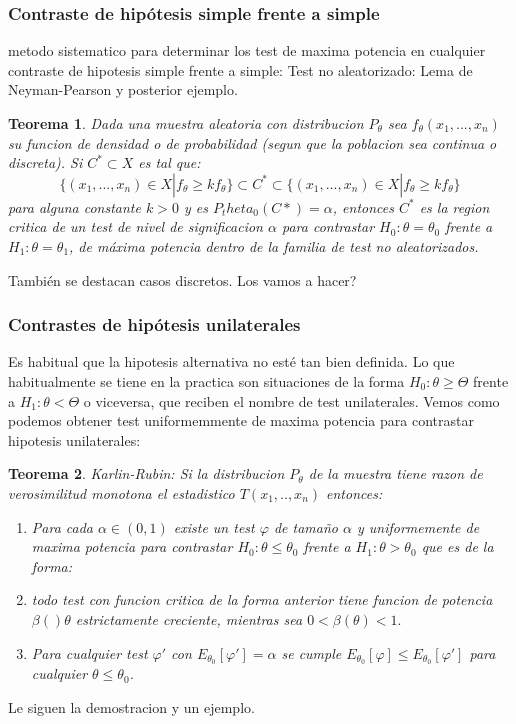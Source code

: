 \documentclass[a4paper,12pt]{article}
\newtheorem{theorem}{Teorema}
\begin{document}
\subsubsection{Contraste de hipótesis simple frente a simple}
metodo sistematico para determinar los test de maxima potencia en cualquier contraste de hipotesis simple frente a simple:
Test no aleatorizado:
Lema de Neyman-Pearson y posterior ejemplo.
\begin{theorem}
Dada una muestra aleatoria con distribucion $P_\theta$ sea $f_\theta(x_1,...,x_n)$ su funcion de densidad o de probabilidad (segun que la poblacion sea continua o discreta). Si $C^*\subset X$ es tal que: $$\{(x_1,...,x_n)\in X | f_\theta \ge kf_\theta\}\subset C^*\subset\{(x_1,...,x_n)\in X | f_\theta \geq kf_\theta\}$$
para alguna constante $k>0$ y es $P_theta_0(C*)=\alpha$, entonces $C^*$ es la region critica de un test de nivel de significacion $\alpha$ para contrastar $H_0:\theta =\theta_0$ frente a $H_1: \theta=\theta_1$, de máxima potencia dentro de la familia de test no aleatorizados.
\end{theorem}

 También se destacan casos discretos. Los vamos a hacer?
 
 \subsubsection{Contrastes de hipótesis unilaterales}


Es habitual que la hipotesis alternativa no esté tan bien definida. Lo que habitualmente se tiene en la practica son situaciones de la forma $H_0: \theta \geq \Theta$ frente a $H_1: \theta < \Theta$ o viceversa, que reciben el nombre de test unilaterales. Vemos como podemos obtener test uniformemmente de maxima potencia para contrastar hipotesis unilaterales:
\begin{theorem}
	Karlin-Rubin: Si la distribucion $P_\theta$ de la muestra tiene razon de verosimilitud monotona el estadistico $T(x_1,..,x_n)$ entonces:
	\begin{enumerate}[a]
		\item Para cada $\alpha\in(0,1)$ existe un test $\varphi$ de tamaño $\alpha$ y uniformemente de maxima potencia para contrastar $H_0: \theta \leq\theta_0$ frente a $H_1: \theta >\theta_0$ que es de la forma: 
		
		\item todo test con funcion critica de la forma anterior tiene funcion de potencia $\beta()\theta$ estrictamente creciente, mientras sea $0<\beta(\theta)<1.$
		\item Para cualquier test $\varphi'$ con $E_{\theta_0}[\varphi']=\alpha$ se cumple $E_{\theta_0}[\varphi]\leq E_{\theta_0}[\varphi']$ para cualquier $\theta \leq \theta_0$.
	\end{enumerate}
\end{theorem}
Le siguen la demostracion y un ejemplo.
\end{document}
